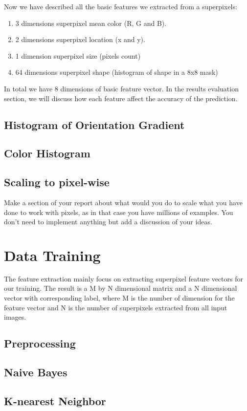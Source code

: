 \documentclass[paper=letter, fontsize=11pt]{scrartcl}
\numberwithin{equation}{section}		%
\numberwithin{figure}{section}			%
\numberwithin{table}{section}				%
\begin{document}
Now we have described all the basic features we extracted from a superpixels:
\begin{enumerate}
	\item 3 dimensions superpixel mean color (R, G and B).
	\item 2 dimensions superpixel location (x and y).
	\item 1 dimension superpixel size (pixels count)
	\item 64 dimensions superpixel shape (histogram of shape in a 8x8 mask)
\end{enumerate}

In total we have 8 dimensions of basic feature vector. In the results evaluation section, we will discuss how each feature affect the accuracy of the prediction.



\subsection{Histogram of Orientation Gradient}
\subsection{Color Histogram}
\subsection{Scaling to pixel-wise}
Make a section of your report about what would you do to scale what you have done to work with pixels, as in that case you have millions of examples. You don't need to implement anything
but add a discussion of your ideas. 

\section{Data Training}
The feature extraction mainly focus on extracting superpixel feature vectors for our training. The result is a M by N dimensional matrix and a N dimensional vector with corresponding label, where M is the number of dimension for the feature vector and N is the number of superpixels extracted from all input images. 
\subsection{Preprocessing}
\subsection{Naive Bayes}
\subsection{K-nearest Neighbor}
\end{document}

